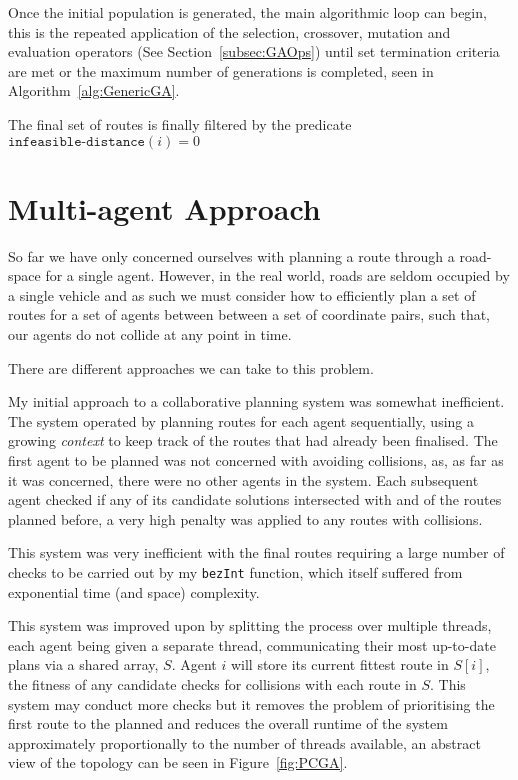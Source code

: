 Once the initial population is generated, the main algorithmic loop can begin, this is the repeated application of the selection, crossover, mutation and evaluation operators (See Section~\ref{subsec:GAOps}) until set termination criteria are met or the maximum number of generations is completed, seen in Algorithm~\ref{alg:GenericGA}.

The final set of routes is finally filtered by the predicate $\texttt{infeasible-distance}(i) = 0 $

\section{Multi-agent Approach}
\label{sec:maa}

So far we have only concerned ourselves with planning a route through a road-space for a single agent. However, in the real world, roads are seldom occupied by a single vehicle and as such we must consider how to efficiently plan a set of routes for a set of agents between between a set of coordinate pairs, such that, our agents do not collide at any point in time.

There are different approaches we can take to this problem. 

My initial approach to a collaborative planning system was somewhat inefficient. The system operated by planning routes for each agent sequentially, using a growing \textit{context} to keep track of the routes that had already been finalised. The first agent to be planned was not concerned with avoiding collisions, as, as far as it was concerned, there were no other agents in the system. Each subsequent agent checked if any of its candidate solutions intersected with and of the routes planned before, a very high penalty was applied to any routes with collisions.

This system was very inefficient with the final routes requiring a large number of checks to be carried out by my \texttt{bezInt} function, which itself suffered from  exponential time (and space) complexity.

This system was improved upon by splitting the process over multiple threads, each agent being given a separate thread, communicating their most up-to-date plans via a shared array, $S$. Agent $i$ will store its current fittest route in $S[i]$, the fitness of any candidate checks for collisions with each route in $S$. This system may conduct more checks but it removes the problem of prioritising the first route to the planned and reduces the overall runtime of the system approximately proportionally to the number of threads available, an abstract view of the topology can be seen in Figure~\ref{fig:PCGA}.

